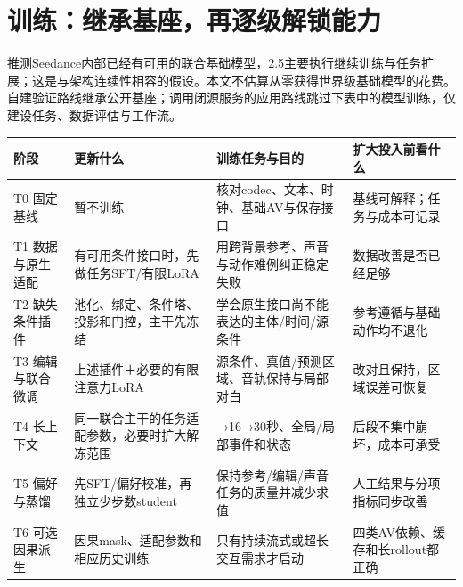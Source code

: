 \section{训练：继承基座，再逐级解锁能力}\label{seedance-m27-ux8badux7ec3ux7ee7ux627fux57faux5ea7ux518dux9010ux7ea7ux89e3ux9501ux80fdux529b}

推测Seedance内部已经有可用的联合基础模型，2.5主要执行继续训练与任务扩展；这是与架构连续性相容的假设。本文不估算从零获得世界级基础模型的花费。自建验证路线继承公开基座；调用闭源服务的应用路线跳过下表中的模型训练，仅建设任务、数据评估与工作流。

{\def\LTcaptype{table} %
\small\setlength{\tabcolsep}{3pt}\renewcommand{\arraystretch}{1.18}
\begin{longtable}[]{@{}
  >{\raggedright\arraybackslash}p{}
  >{\raggedright\arraybackslash}p{}
  >{\raggedright\arraybackslash}p{}
  >{\raggedright\arraybackslash}p{}@{}}
\toprule\noalign{}
\begin{minipage}[b]{\linewidth}\raggedright
阶段
\end{minipage} & \begin{minipage}[b]{\linewidth}\raggedright
更新什么
\end{minipage} & \begin{minipage}[b]{\linewidth}\raggedright
训练任务与目的
\end{minipage} & \begin{minipage}[b]{\linewidth}\raggedright
扩大投入前看什么
\end{minipage} \\
\midrule\noalign{}
\endhead
\bottomrule\noalign{}
\endlastfoot
T0 固定基线 & 暂不训练 & 核对codec、文本、时钟、基础AV与保存接口 & 基线可解释；任务与成本可记录 \\
T1 数据与原生适配 & 有可用条件接口时，先做任务SFT/有限LoRA & 用跨背景参考、声音与动作难例纠正稳定失败 & 数据改善是否已经足够 \\
T2 缺失条件插件 & 池化、绑定、条件塔、投影和门控，主干先冻结 & 学会原生接口尚不能表达的主体/时间/源条件 & 参考遵循与基础动作均不退化 \\
T3 编辑与联合微调 & 上述插件＋必要的有限注意力LoRA & 源条件、真值/预测区域、音轨保持与局部对白 & 改对且保持，区域误差可恢复 \\
T4 长上下文 & 同一联合主干的任务适配参数，必要时扩大解冻范围 & 8→16→30秒、全局/局部事件和状态 & 后段不集中崩坏，成本可承受 \\
T5 偏好与蒸馏 & 先SFT/偏好校准，再独立少步数student & 保持参考/编辑/声音任务的质量并减少求值 & 人工结果与分项指标同步改善 \\
T6 可选因果派生 & 因果mask、适配参数和相应历史训练 & 只有持续流式或超长交互需求才启动 & 四类AV依赖、缓存和长rollout都正确 \\
\end{longtable}
}

